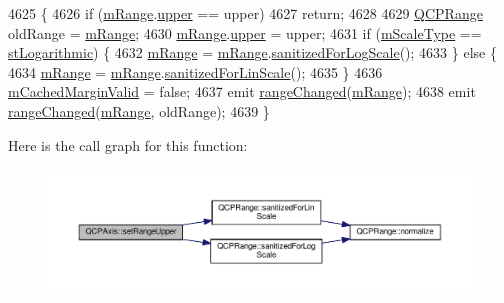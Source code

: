 \begin{DoxyCode}
4625                                         \{
4626   \textcolor{keywordflow}{if} (\hyperlink{class_q_c_p_axis_a1ee36773c49062d751560e11f90845f7}{mRange}.\hyperlink{class_q_c_p_range_ae44eb3aafe1d0e2ed34b499b6d2e074f}{upper} == upper)
4627     \textcolor{keywordflow}{return};
4628 
4629   \hyperlink{class_q_c_p_range}{QCPRange} oldRange = \hyperlink{class_q_c_p_axis_a1ee36773c49062d751560e11f90845f7}{mRange};
4630   \hyperlink{class_q_c_p_axis_a1ee36773c49062d751560e11f90845f7}{mRange}.\hyperlink{class_q_c_p_range_ae44eb3aafe1d0e2ed34b499b6d2e074f}{upper} = upper;
4631   \textcolor{keywordflow}{if} (\hyperlink{class_q_c_p_axis_ad706039549cbbbec5fcb2baf7894e04d}{mScaleType} == \hyperlink{class_q_c_p_axis_a36d8e8658dbaa179bf2aeb973db2d6f0abf5b785ad976618816dc6f79b73216d4}{stLogarithmic}) \{
4632     \hyperlink{class_q_c_p_axis_a1ee36773c49062d751560e11f90845f7}{mRange} = \hyperlink{class_q_c_p_axis_a1ee36773c49062d751560e11f90845f7}{mRange}.\hyperlink{class_q_c_p_range_aaf6a9046e78d91eeb8e89584fe46b034}{sanitizedForLogScale}();
4633   \} \textcolor{keywordflow}{else} \{
4634     \hyperlink{class_q_c_p_axis_a1ee36773c49062d751560e11f90845f7}{mRange} = \hyperlink{class_q_c_p_axis_a1ee36773c49062d751560e11f90845f7}{mRange}.\hyperlink{class_q_c_p_range_a1ff029704c29a75adbc1dc36cecaf44c}{sanitizedForLinScale}();
4635   \}
4636   \hyperlink{class_q_c_p_axis_a2cde37b6e385f47e11322df4ac1b0e9b}{mCachedMarginValid} = \textcolor{keyword}{false};
4637   emit \hyperlink{class_q_c_p_axis_a0894084e4c16a1736534c4095746f910}{rangeChanged}(\hyperlink{class_q_c_p_axis_a1ee36773c49062d751560e11f90845f7}{mRange});
4638   emit \hyperlink{class_q_c_p_axis_a0894084e4c16a1736534c4095746f910}{rangeChanged}(\hyperlink{class_q_c_p_axis_a1ee36773c49062d751560e11f90845f7}{mRange}, oldRange);
4639 \}
\end{DoxyCode}


Here is the call graph for this function\+:\nopagebreak
\begin{figure}[H]
\begin{center}
\leavevmode
\includegraphics[width=350pt]{class_q_c_p_axis_acd3ca1247aa867b540cd5ec30ccd3bef_cgraph}
\end{center}
\end{figure}


